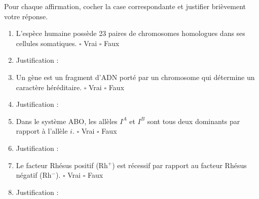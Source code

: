 \documentclass[11pt]{article}
\begin{document}
\begin{exercice}
Pour chaque affirmation, cocher la case correspondante et justifier brièvement votre réponse.
\begin{enumerate}
    \item L'espèce humaine possède 23 paires de chromosomes homologues dans ses cellules somatiques. \hfill $\square$ Vrai $\square$ Faux
    \item Justification : \par\vspace{1.5cm}
    \item Un gène est un fragment d'ADN porté par un chromosome qui détermine un caractère héréditaire. \hfill $\square$ Vrai $\square$ Faux
    \item Justification : \par\vspace{1.5cm}
    \item Dans le système ABO, les allèles $I^A$ et $I^B$ sont tous deux dominants par rapport à l'allèle $i$. \hfill $\square$ Vrai $\square$ Faux
    \item Justification : \par\vspace{1.5cm}
    \item Le facteur Rhésus positif (Rh$^+$) est récessif par rapport au facteur Rhésus négatif (Rh$^-$). \hfill $\square$ Vrai $\square$ Faux
    \item Justification : \par\vspace{1.5cm}
\end{enumerate}
\end{exercice}
\end{document}
